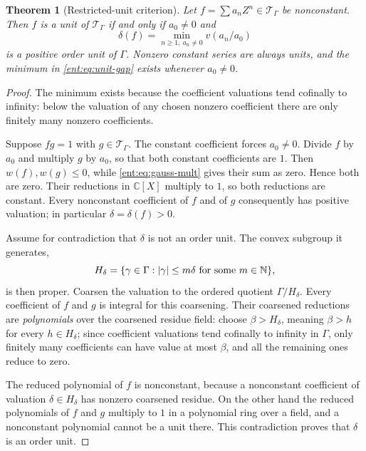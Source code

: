 \documentclass[11pt]{article}
\newtheorem{theorem}{Theorem}[section]
\theoremstyle{plain}
\theoremstyle{plain}
\theoremstyle{plain}
\theoremstyle{definition}
\theoremstyle{definition}
\theoremstyle{definition}
\theoremstyle{definition}
\theoremstyle{remark}
\newcommand{\C}{\mathbb C}\newcommand{\R}{\mathbb R}
\newcommand{\TT}{\mathcal T_\Gamma}
\begin{document}
\begin{theorem}[Restricted-unit criterion]\label{ent:thm:units}
Let $f=\sum a_nZ^n\in\TT$ be nonconstant. Then $f$ is a unit of $\TT$ if and
only if $a_0\ne0$ and
\begin{equation}\label{ent:eq:unit-gap}
 \delta(f)=\min_{n\ge1,\ a_n\ne0}v(a_n/a_0)
\end{equation}
is a positive order unit of $\Gamma$. Nonzero constant series are always
units, and the minimum in \eqref{ent:eq:unit-gap} exists whenever $a_0\ne0$.
\end{theorem}
\begin{proof}
The minimum exists because the coefficient valuations tend cofinally to
infinity: below the valuation of any chosen nonzero coefficient there are
only finitely many nonzero coefficients.

Suppose $fg=1$ with $g\in\TT$. The constant coefficient forces $a_0\ne0$.
Divide $f$ by $a_0$ and multiply $g$ by $a_0$, so that both constant
coefficients are $1$. Then $w(f),w(g)\le0$, while \eqref{ent:eq:gauss-mult}
gives their sum as zero. Hence both are zero. Their reductions in $\C[X]$
multiply to $1$, so both reductions are constant. Every nonconstant
coefficient of $f$ and of $g$ consequently has positive valuation; in
particular $\delta=\delta(f)>0$.

Assume for contradiction that $\delta$ is not an order unit. The convex
subgroup it generates,
\begin{equation}\label{ent:eq:Hdelta}
 H_\delta=\{\gamma\in\Gamma:|\gamma|\le m\delta
                       \text{ for some }m\in\mathbb N\},
\end{equation}
is then proper. Coarsen the valuation to the ordered quotient
$\Gamma/H_\delta$. Every coefficient of $f$ and $g$ is integral for this
coarsening. Their coarsened reductions are \emph{polynomials} over the
coarsened residue field: choose $\beta>H_\delta$, meaning $\beta>h$ for every
$h\in H_\delta$; since coefficient valuations tend cofinally to infinity in
$\Gamma$, only finitely many coefficients can have value at most $\beta$, and
all the remaining ones reduce to zero.

The reduced polynomial of $f$ is nonconstant, because a nonconstant
coefficient of valuation $\delta\in H_\delta$ has nonzero coarsened residue.
On the other hand the reduced polynomials of $f$ and $g$ multiply to $1$ in a
polynomial ring over a field, and a nonconstant polynomial cannot be a unit
there. This contradiction proves that $\delta$ is an order unit.


\end{proof}
\end{document}
